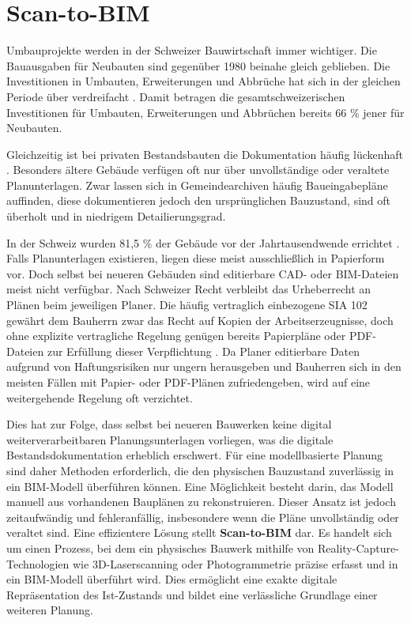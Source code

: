 \section{Scan-to-BIM}
\begin{German}
    Umbauprojekte werden in der Schweizer Bauwirtschaft immer wichtiger. Die Bauausgaben für Neubauten sind gegenüber 1980 beinahe gleich geblieben. Die Investitionen in Umbauten, Erweiterungen und Abbrüche hat sich in der gleichen Periode über verdreifacht \cite{bundesamtfuerstatstikBauausgabenNachArt}. Damit betragen die gesamtschweizerischen Investitionen für Umbauten, Erweiterungen und Abbrüchen bereits 66 \% jener für Neubauten. 

    Gleichzeitig ist bei privaten Bestandsbauten die Dokumentation häufig lückenhaft \cite{dewolfCircularBuiltEnvironmentg, kadenLeitfadenGeodaesieUnd}. Besonders ältere Gebäude verfügen oft nur über unvollständige oder veraltete Planunterlagen. Zwar lassen sich in Gemeindearchiven häufig Baueingabepläne auffinden, diese dokumentieren jedoch den ursprünglichen Bauzustand, sind oft überholt und in niedrigem Detailierungsgrad.
    
    In der Schweiz wurden 81,5 \% der Gebäude vor der Jahrtausendwende errichtet \cite{bundesamtfuerstatstikBauperiode}. Falls Planunterlagen existieren, liegen diese meist ausschließlich in Papierform vor. Doch selbst bei neueren Gebäuden sind editierbare CAD- oder BIM-Dateien meist nicht verfügbar. Nach Schweizer Recht verbleibt das Urheberrecht an Plänen beim jeweiligen Planer. Die häufig vertraglich einbezogene SIA 102 gewährt dem Bauherrn zwar das Recht auf Kopien der Arbeitserzeugnisse, doch ohne explizite vertragliche Regelung genügen bereits Papierpläne oder PDF-Dateien zur Erfüllung dieser Verpflichtung \cite{bundschwBauenRechtenUnd}. Da Planer editierbare Daten aufgrund von Haftungsrisiken nur ungern herausgeben und Bauherren sich in den meisten Fällen mit Papier- oder PDF-Plänen zufriedengeben, wird auf eine weitergehende Regelung oft verzichtet. 
    
    Dies hat zur Folge, dass selbst bei neueren Bauwerken keine digital weiterverarbeitbaren Planungsunterlagen vorliegen, was die digitale Bestandsdokumentation erheblich erschwert. Für eine modellbasierte Planung sind daher Methoden erforderlich, die den physischen Bauzustand zuverlässig in ein BIM-Modell überführen können. Eine Möglichkeit besteht darin, das Modell manuell aus vorhandenen Bauplänen zu rekonstruieren. Dieser Ansatz ist jedoch zeitaufwändig und fehleranfällig, insbesondere wenn die Pläne unvollständig oder veraltet sind. Eine effizientere Lösung stellt \textbf{Scan-to-BIM} dar. Es handelt sich um einen Prozess, bei dem ein physisches Bauwerk mithilfe von Reality-Capture-Technologien wie 3D-Laserscanning oder Photogrammetrie präzise erfasst und in ein BIM-Modell überführt wird. Dies ermöglicht eine exakte digitale Repräsentation des Ist-Zustands und bildet eine verlässliche Grundlage einer weiteren Planung.
    

\end{German}
